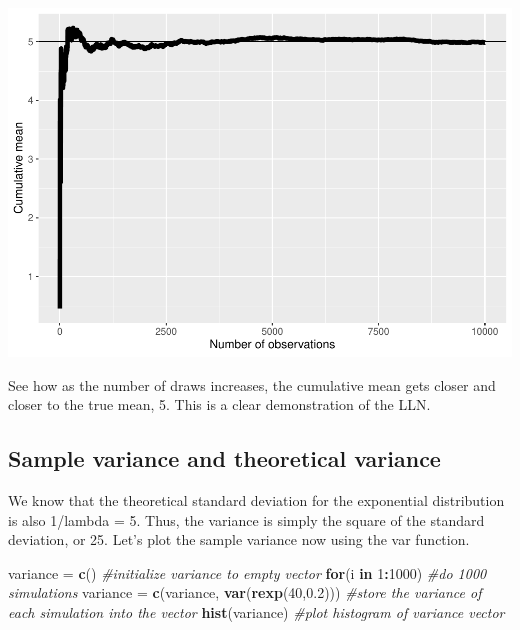 \documentclass[
]{article}
\newenvironment{Shaded}{\begin{snugshade}}{\end{snugshade}}
\newcommand{\CommentTok}[1]{\textcolor[rgb]{0.56,0.35,0.01}{\textit{#1}}}
\newcommand{\ControlFlowTok}[1]{\textcolor[rgb]{0.13,0.29,0.53}{\textbf{#1}}}
\newcommand{\DecValTok}[1]{\textcolor[rgb]{0.00,0.00,0.81}{#1}}
\newcommand{\FloatTok}[1]{\textcolor[rgb]{0.00,0.00,0.81}{#1}}
\newcommand{\KeywordTok}[1]{\textcolor[rgb]{0.13,0.29,0.53}{\textbf{#1}}}
\newcommand{\NormalTok}[1]{#1}
\newcommand{\OperatorTok}[1]{\textcolor[rgb]{0.81,0.36,0.00}{\textbf{#1}}}
\newcommand{\StringTok}[1]{\textcolor[rgb]{0.31,0.60,0.02}{#1}}
\begin{document}
\includegraphics{C6Project_files/figure-latex/cumulativemean-1.pdf}

See how as the number of draws increases, the cumulative mean gets
closer and closer to the true mean, 5. This is a clear demonstration of
the LLN.

\hypertarget{sample-variance-and-theoretical-variance}{%
\subsection{Sample variance and theoretical
variance}\label{sample-variance-and-theoretical-variance}}

We know that the theoretical standard deviation for the exponential
distribution is also 1/lambda = 5. Thus, the variance is simply the
square of the standard deviation, or 25. Let's plot the sample variance
now using the var function.

\begin{Shaded}
\begin{Highlighting}[]
\NormalTok{variance =}\StringTok{ }\KeywordTok{c}\NormalTok{() }\CommentTok{#initialize variance to empty vector}
\ControlFlowTok{for}\NormalTok{(i }\ControlFlowTok{in} \DecValTok{1}\OperatorTok{:}\DecValTok{1000}\NormalTok{) }\CommentTok{#do 1000 simulations}
\NormalTok{  variance =}\StringTok{ }\KeywordTok{c}\NormalTok{(variance, }\KeywordTok{var}\NormalTok{(}\KeywordTok{rexp}\NormalTok{(}\DecValTok{40}\NormalTok{,}\FloatTok{0.2}\NormalTok{))) }\CommentTok{#store the variance of each simulation into the vector}
\KeywordTok{hist}\NormalTok{(variance) }\CommentTok{#plot histogram of variance vector}
\end{Highlighting}
\end{Shaded}
\end{document}

